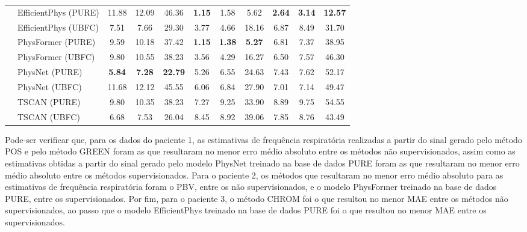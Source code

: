 \begin{table}[h!]
{\begin{tabular}{llccccccccc}
& EfficientPhys (PURE)
& 11.88 & 12.09 & 46.36
& \textbf{1.15} & 1.58 & 5.62
& \textbf{2.64} & \textbf{3.14} & \textbf{12.57} \\

& EfficientPhys (UBFC)
& 7.51 & 7.66 & 29.30
& 3.77 & 4.66 & 18.16
& 6.87 & 8.49 & 31.70 \\

& PhysFormer (PURE)
& 9.59 & 10.18 & 37.42
& \textbf{1.15} & \textbf{1.38} & \textbf{5.27}
& 6.81 & 7.37 & 38.95 \\

& PhysFormer (UBFC)
& 9.80 & 10.55 & 38.23
& 3.56 & 4.29 & 16.27
& 6.50 & 7.57 & 46.30 \\

& PhysNet (PURE)
& \textbf{5.84} & \textbf{7.28} & \textbf{22.79}
& 5.26 & 6.55 & 24.63
& 7.43 & 7.62 & 52.17 \\

& PhysNet (UBFC)
& 11.68 & 12.12 & 45.55
& 6.06 & 6.84 & 27.90
& 7.01 & 7.14 & 49.47 \\

& TSCAN (PURE)
& 9.80 & 10.35 & 38.23
& 7.27 & 9.25 & 33.90
& 8.89 & 9.75 & 54.55 \\

& TSCAN (UBFC)
& 6.68 & 7.53 & 26.04
& 8.45 & 8.92 & 39.06
& 7.85 & 8.76 & 43.49 \\

\hline
\end{tabular}
}
\label{tab:rppg_rr_metrics_all}
\end{table}

Pode-ser verificar que, para os dados do paciente 1, as estimativas de frequência respiratória realizadas a partir do sinal gerado pelo método POS e pelo método GREEN foram as que resultaram no menor erro médio absoluto entre os métodos não supervisionados, assim como as estimativas obtidas a partir do sinal gerado pelo modelo PhysNet treinado na base de dados PURE foram as que resultaram no menor erro médio absoluto entre os métodos supervisionados. Para o paciente 2, os métodos que resultaram no menor erro médio absoluto para as estimativas de frequência respiratória foram o PBV, entre os não supervisionados, e o modelo PhysFormer treinado na base de dados PURE, entre os supervisionados. Por fim, para o paciente 3, o método CHROM foi o que resultou no menor MAE entre os métodos não supervisionados, ao passo que o modelo EfficientPhys treinado na base de dados PURE foi o que resultou no menor MAE entre os supervisionados.


